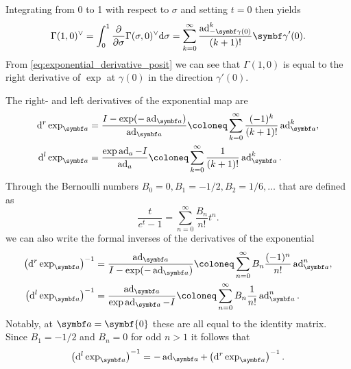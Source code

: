 Integrating from 0 to 1 with respect to $\sigma$ and setting $t = 0$ then yields
\begin{equation}
  \Gamma(1, 0)^\vee = \int_0^1 \frac{\partial}{\partial \sigma} \Gamma(\sigma, 0)^\vee \mathrm{d} \sigma = \sum_{k=0}^\infty \frac{\ad^k_{-\bgamma(0)}}{(k+1)!}\bgamma'(0).
\end{equation}
From \eqref{eq:exponential_derivative_posit} we can see that $\Gamma(1, 0)$ is equal to the right derivative of $\exp$ at $\gamma(0)$ in the direction $\gamma'(0)$.


\begin{properties}
  The right- and left derivatives of the exponential map are
  \begin{equation}
    \label{eq:dexp_def}
    \begin{aligned}
      \mathrm{d}^r \exp_\a & = \frac{I - \exp (-\ad_{\a})}{\ad_{\a}} \coloneq \sum_{k=0}^\infty \frac{(-1)^k }{(k+1)!} \ad^k_{\a}, \\
      \mathrm{d}^l \exp_\a & = \frac{\exp \ad_{a} - I}{\ad_{a}} \coloneq \sum_{k=0}^\infty \frac{1 }{(k+1)!} \ad^k_{\a}.
    \end{aligned}
  \end{equation}
  Through the Bernoulli numbers $B_0 = 0, B_1 = -1/2, B_2 = 1/6, \ldots$ that are defined as
  \begin{equation}
    \label{eq:bernoulli_number_def}
    \frac{t}{e^t - 1} = \sum_{n=0}^\infty \frac{B_n}{n!} t^n.
  \end{equation}
  we can also write the formal inverses of the derivatives of the exponential
  \begin{equation}
    \label{eq:dexpinv_def}
    \begin{aligned}
      \left(\mathrm{d}^r \exp_\a\right)^{-1} & = \frac{\ad_{\a}}{I - \exp (- \ad_{\a})} \coloneq \sum_{n=0}^\infty B_n \frac{(-1)^n}{n!} \ad_{\a}^n, \\
      \left(\mathrm{d}^l \exp_\a\right)^{-1} & = \frac{\ad_{\a}}{\exp \ad_{\a} - I} \coloneq \sum_{n=0}^\infty B_n \frac{1}{n!} \ad_\a^n.
    \end{aligned}
  \end{equation}
  Notably, at $\a = \symbf{0}$ these are all equal to the identity matrix. Since $B_1 = -1/2$ and $B_n = 0$ for odd $n > 1$ it follows that
  \begin{equation}
    \left(\mathrm{d}^l \exp_\a\right)^{-1} = -\ad_\a + \left(\mathrm{d}^r \exp_\a\right)^{-1}.
  \end{equation}
\end{properties}

